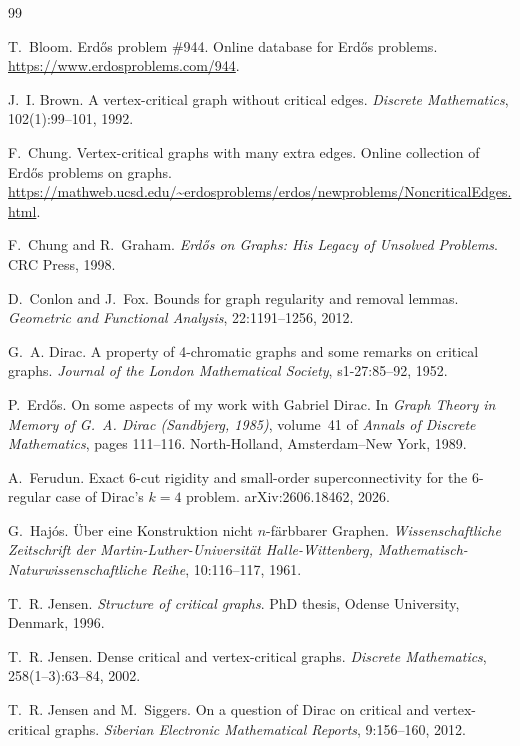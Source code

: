 \documentclass[11pt,letterpaper]{article}
\numberwithin{equation}{section}
\theoremstyle{plain}
\theoremstyle{definition}
\theoremstyle{remark}
\begin{document}
\begin{thebibliography}{99}

T.~Bloom.
Erd\H{o}s problem \#944.
Online database for Erd\H{o}s problems.
\url{https://www.erdosproblems.com/944}.

J.~I. Brown.
A vertex-critical graph without critical edges.
\emph{Discrete Mathematics}, 102(1):99--101, 1992.

F.~Chung.
Vertex-critical graphs with many extra edges.
Online collection of Erd\H{o}s problems on graphs.
\url{https://mathweb.ucsd.edu/~erdosproblems/erdos/newproblems/NoncriticalEdges.html}.

F.~Chung and R.~Graham.
\emph{Erd\H{o}s on Graphs: His Legacy of Unsolved Problems}.
CRC Press, 1998.

D.~Conlon and J.~Fox.
Bounds for graph regularity and removal lemmas.
\emph{Geometric and Functional Analysis}, 22:1191--1256, 2012.

G.~A. Dirac.
A property of 4-chromatic graphs and some remarks on critical graphs.
\emph{Journal of the London Mathematical Society}, s1-27:85--92, 1952.

P.~Erd\H{o}s.
On some aspects of my work with Gabriel Dirac.
In \emph{Graph Theory in Memory of G.~A. Dirac (Sandbjerg, 1985)}, volume~41 of \emph{Annals of Discrete Mathematics}, pages 111--116. North-Holland, Amsterdam--New York, 1989.

A.~Ferudun.
Exact 6-cut rigidity and small-order superconnectivity for the 6-regular case of Dirac's $k=4$ problem.
arXiv:2606.18462, 2026.

G.~Haj\'os.
\"Uber eine Konstruktion nicht $n$-f\"arbbarer Graphen.
\emph{Wissenschaftliche Zeitschrift der Martin-Luther-Universit\"at Halle-Wittenberg, Mathematisch-Naturwissenschaftliche Reihe}, 10:116--117, 1961.

T.~R. Jensen.
\emph{Structure of critical graphs}.
PhD thesis, Odense University, Denmark, 1996.

T.~R. Jensen.
Dense critical and vertex-critical graphs.
\emph{Discrete Mathematics}, 258(1--3):63--84, 2002.

T.~R. Jensen and M.~Siggers.
On a question of Dirac on critical and vertex-critical graphs.
\emph{Siberian Electronic Mathematical Reports}, 9:156--160, 2012.


\end{thebibliography}
\end{document}

